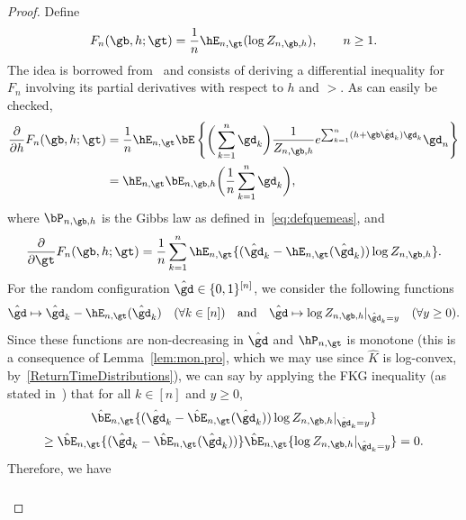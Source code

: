 \begin{proof}
Define
\begin{equation}\label{Fnbht}
F_n(\gb,h;\gt) = \frac{1}{n} \hE_{n,\gt} (\log Z_{n,\gb,h}), \qquad n \geq 1.
\end{equation}
The idea is borrowed from~\cite{CadH13} and consists of deriving a differential inequality for $F_n$ involving its partial derivatives with respect to $h$ and $\gt$. As can easily be checked,
\begin{equation}\label{hDerivative}
\begin{aligned}
\frac{\partial}{\partial h} F_n(\gb,h;\gt) &= \frac{1}{n} \hE_{n,\gt} \bE \left\{ \bigg(\sum_{k=1}^n \gd_k \bigg) \frac{1}{Z_{n,\gb,h}} e^{\sum_{k=1}^n (h + \gb \hat \gd_k) \gd_k} \gd_n \right\}\\
&= \hE_{n,\gt} \bE_{n,\gb,h} \bigg(\frac{1}{n} \sum_{k=1}^n \gd_k \bigg),
\end{aligned}
\end{equation}
where $\bP_{n,\gb,h}$ is the Gibbs law as defined in~\eqref{eq:defquemeas}, and
\begin{equation}\label{FKGApplication}
\frac{\partial}{\partial \gt} F_n(\gb,h;\gt) = \frac{1}{n} \sum_{k=1}^n \hE_{n,\gt} \{(\hat \gd_k - \hE_{n,\gt}(\hat \gd_k)) \log Z_{n,\gb,h}\}.
\end{equation}
For the random configuration $\hat \gd \in \{0,1\}^{[n]}$, we consider the following functions
\begin{equation}
\hat \gd \mapsto \hat \gd_k - \hE_{n,\gt}(\hat \gd_k) \quad (\forall k\in[n]) \quad \text{and}\quad
\hat \gd\mapsto \log Z_{n, \gb, h}|_{\hat \gd_k=y} \quad(\forall y\geq0).
\end{equation}
Since these functions are non-decreasing in $\hat \gd$ and $\hP_{n,\gt}$ is monotone (this is a consequence of Lemma~\ref{lem:mon.pro}, which we may use since $\hat K$ is log-convex, by~\eqref{ReturnTimeDistributions}), we can say by applying the FKG inequality (as stated in~\cite[Theorem~4.11]{GHM1999}) that for all $k\in[n]$ and $y\ge0$,
\begin{multline}
\hat \bE_{n, \gt}\{(\hat \gd_k-\hat\bE_{n, \gt}(\hat \gd_k))\log Z_{n, \gb, h}|_{\hat \gd_k=y}\}\\
\geq \hat \bE_{n, \gt}\{(\hat \gd_k-\hat\bE_{n, \gt}(\hat \gd_k))\} \hat \bE_{n, \gt}\{ \log Z_{n, \gb, h}|_{\hat \gd_k=y}\} = 0.
\end{multline}
Therefore, we have
\begin{align}\label{eq:deriv_F_theta}
\begin{aligned}

\end{aligned}
\end{align}
\end{proof}
